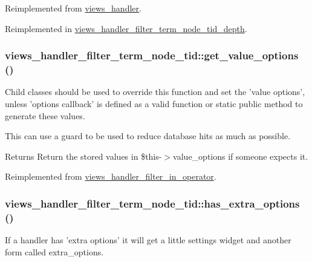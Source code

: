Reimplemented from \hyperlink{classviews__handler_a0eed1d12c47d60190f59e135d962719e}{views\_\-handler}.

Reimplemented in \hyperlink{classviews__handler__filter__term__node__tid__depth_a704c5e42a5a41ee12bd01b1b153431e4}{views\_\-handler\_\-filter\_\-term\_\-node\_\-tid\_\-depth}.\hypertarget{classviews__handler__filter__term__node__tid_a78e569201a5b833da4aafbf325a77c44}{
\subsubsection[{get\_\-value\_\-options}]{\setlength{\rightskip}{0pt plus 5cm}views\_\-handler\_\-filter\_\-term\_\-node\_\-tid::get\_\-value\_\-options ()}}
\label{classviews__handler__filter__term__node__tid_a78e569201a5b833da4aafbf325a77c44}
Child classes should be used to override this function and set the 'value options', unless 'options callback' is defined as a valid function or static public method to generate these values.

This can use a guard to be used to reduce database hits as much as possible.

\begin{DoxyReturn}{Returns}
Return the stored values in \$this-\/$>$value\_\-options if someone expects it. 
\end{DoxyReturn}


Reimplemented from \hyperlink{classviews__handler__filter__in__operator_aa5b5df6d90f4359ed28c0c446bdc81a6}{views\_\-handler\_\-filter\_\-in\_\-operator}.\hypertarget{classviews__handler__filter__term__node__tid_a72232eda675756741ce92061cb4685ee}{
\subsubsection[{has\_\-extra\_\-options}]{\setlength{\rightskip}{0pt plus 5cm}views\_\-handler\_\-filter\_\-term\_\-node\_\-tid::has\_\-extra\_\-options ()}}
\label{classviews__handler__filter__term__node__tid_a72232eda675756741ce92061cb4685ee}
If a handler has 'extra options' it will get a little settings widget and another form called extra\_\-options. 

